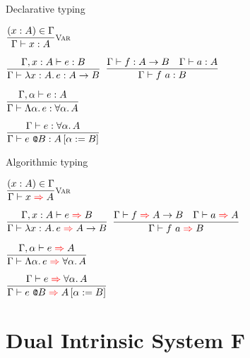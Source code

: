 \documentclass{beamer}
\begin{document}
\begin{frame}{Declarative typing}

\begin{center}
  $\infrule[Var]{\sidecond{(x : A) \in \Gamma}}{\typing{x}{A}}$

  \vspace{2em}

  $\infrule{\fulltyping{\extend{\Gamma}{x}{A}}{e}{B}}{\typing{\ifun{x}{A}{e}}{\Fun{A}{B}}}$ \quad
  $\infrule{\typing{f}{\Fun{A}{B}} \quad \typing{a}{A}}{\typing{\app{f}{a}}{B}}$

  \vspace{2em}

  $\infrule{\fulltyping{\extendtype{\Gamma}{\alpha}}{e}{A}}{\typing{\tfun{\alpha}{e}}{\ForallT{\alpha}{A}}}$

  \vspace{2em}

  $\infrule{\typing{e}{\ForallT{\alpha}{A}}}{\typing{\tapp{e}{B}}{\subst{A}{\alpha}{B}}}$
\end{center}

\end{frame}

\begin{frame}{Algorithmic typing}

\begin{center}
  $\infrule[Var]{\sidecond{(x : A) \in \Gamma}}{\infer{x}{A}}$

  \vspace{2em}

  $\infrule{\fullinfer{\extend{\Gamma}{x}{A}}{e}{B}}{\infer{\ifun{x}{A}{e}}{\Fun{A}{B}}}$ \quad
  $\infrule{\infer{f}{\Fun{A}{B}} \quad \infer{a}{A}}{\infer{\app{f}{a}}{B}}$

  \vspace{2em}

  $\infrule{\fullinfer{\extendtype{\Gamma}{\alpha}}{e}{A}}{\infer{\tfun{\alpha}{e}}{\ForallT{\alpha}{A}}}$

  \vspace{2em}

  $\infrule{\infer{e}{\ForallT{\alpha}{A}}}{\infer{\tapp{e}{B}}{\subst{A}{\alpha}{B}}}$
\end{center}

\end{frame}

\section{Dual Intrinsic System F}
\end{document}
